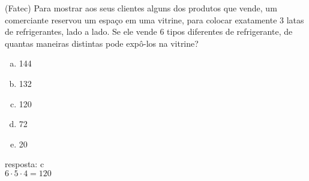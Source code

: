 \begin{ex}
 (Fatec) Para mostrar aos seus clientes alguns dos produtos que vende, um comerciante reservou um espaço em uma vitrine, para colocar exatamente 3 latas de refrigerantes, lado a lado. Se ele vende 6 tipos diferentes de refrigerante, de quantas maneiras distintas pode expô-los na vitrine?
    \begin{enumerate}[(a)]
    \item 144
    \item 132
    \item 120
    \item 72
    \item 20
    \end{enumerate}
      \begin{sol}
        resposta: c  \\
        \(6\cdot5\cdot4=120\)
    
      \end{sol}
\end{ex}